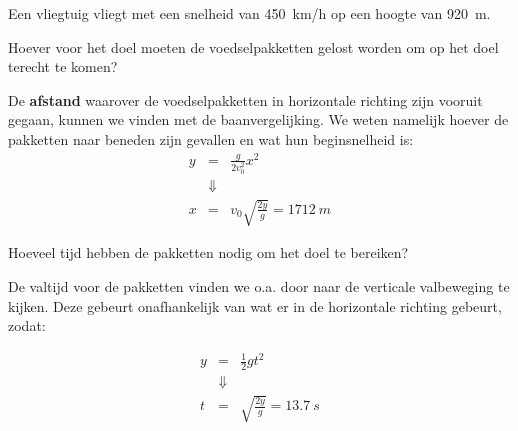 \documentclass{ximera}
\begin{document}
\begin{example}
	Een vliegtuig vliegt met een snelheid van \SI{450}{km/h} op een hoogte van \SI{920}{m}.
	\begin{question} Hoever voor het doel moeten de voedselpakketten gelost worden om op het doel terecht te komen? 
		\begin{oplossing}  
			De \textbf{afstand} waarover de voedselpakketten in horizontale richting zijn vooruit gegaan, kunnen we vinden met de baanvergelijking. We weten namelijk hoever de pakketten naar beneden zijn gevallen en wat hun beginsnelheid is:
			\begin{eqnarray*}
				y&=&\frac{g}{2v_0^2}x^2\\
				&\Downarrow&\\
				x&=&v_0\sqrt{\frac{2y}{g}}=\SI{1712}{m}
			\end{eqnarray*}
		
		\end{oplossing} 
	\end{question}

	\begin{question} Hoeveel tijd hebben de pakketten nodig om het doel te bereiken?                                
		\begin{oplossing}  
		De valtijd voor de pakketten vinden we o.a. door naar de verticale valbeweging te kijken. Deze gebeurt onafhankelijk van wat er in de horizontale richting gebeurt, zodat:

			\begin{eqnarray*}
				y&=&\frac{1}{2}gt^2\\
				&\Downarrow&\\
				t&=&\sqrt{\frac{2y}{g}}=\SI{13,7}{s}
			\end{eqnarray*}
		\end{oplossing} 
	\end{question}




\end{example}
	
\end{document}
